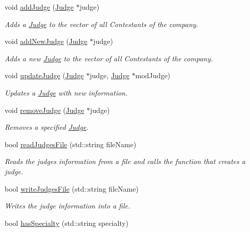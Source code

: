 \begin{DoxyCompactItemize}
void \hyperlink{class_company_a349e0b6205c7dfe137e50cd35666448e}{add\+Judge} (\hyperlink{class_judge}{Judge} $\ast$judge)
\begin{DoxyCompactList}\small\item\em Adds a \hyperlink{class_judge}{Judge} to the vector of all Contestants of the company. \end{DoxyCompactList}\item 
void \hyperlink{class_company_a0103d856876e3cb9188d1bf71903baff}{add\+New\+Judge} (\hyperlink{class_judge}{Judge} $\ast$judge)
\begin{DoxyCompactList}\small\item\em Adds a new \hyperlink{class_judge}{Judge} to the vector of all Contestants of the company. \end{DoxyCompactList}\item 
void \hyperlink{class_company_a315bc334167bce6e6836b6462f85e959}{update\+Judge} (\hyperlink{class_judge}{Judge} $\ast$judge, \hyperlink{class_judge}{Judge} $\ast$mod\+Judge)
\begin{DoxyCompactList}\small\item\em Updates a \hyperlink{class_judge}{Judge} with new information. \end{DoxyCompactList}\item 
void \hyperlink{class_company_a39346c8e12c0cdcd47e300089301a6ea}{remove\+Judge} (\hyperlink{class_judge}{Judge} $\ast$judge)
\begin{DoxyCompactList}\small\item\em Removes a specified \hyperlink{class_judge}{Judge}. \end{DoxyCompactList}\item 
bool \hyperlink{class_company_a5c53dbd29fab7972acbb7e92eeee2ee5}{read\+Judges\+File} (std\+::string file\+Name)
\begin{DoxyCompactList}\small\item\em Reads the judges information from a file and calls the function that creates a judge. \end{DoxyCompactList}\item 
bool \hyperlink{class_company_acfdd8f76389ec02d7ab72625ac1bb9d1}{write\+Judges\+File} (std\+::string file\+Name)
\begin{DoxyCompactList}\small\item\em Writes the judge information into a file. \end{DoxyCompactList}\item 
bool \hyperlink{class_company_a3976d4ec91c9f9dfe1b777b4d7587684}{has\+Specialty} (std\+::string specialty)

\end{DoxyCompactItemize}
